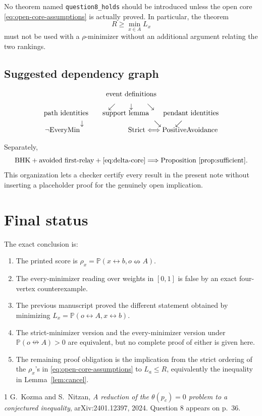 \documentclass[11pt]{article}
\theoremstyle{definition}
\newcommand{\PP}{\mathbb P}
\newcommand{\con}{\leftrightarrow}
\newcommand{\ncon}{\nleftrightarrow}
\newcommand{\1}{\mathbf 1}
\begin{document}
No theorem named \texttt{question8\_holds} should be introduced unless the
open core \eqref{eq:open-core-assumptions} is actually proved.  In
particular, the theorem
\[
 R\ge\min_{x\in A}L_x
\]
must not be used with a \(\rho\)-minimizer without an additional argument
relating the two rankings.

\subsection*{Suggested dependency graph}

\[
\begin{array}{c}
\text{event definitions}
\\[2mm]
\swarrow\qquad\downarrow\qquad\searrow
\\[-1mm]
\text{path identities}
\qquad
\text{support lemma}
\qquad
\text{pendant identities}
\\[1mm]
\downarrow\hspace{35mm}\searrow\qquad\swarrow
\\[-1mm]
\neg\text{EveryMin}
\hspace{24mm}
\text{Strict}\Longleftrightarrow\text{PositiveAvoidance}
\end{array}
\]

Separately,
\[
\text{BHK}+\text{avoided first-relay}+\eqref{eq:delta-core}
\Longrightarrow\text{Proposition~\ref{prop:sufficient}}.
\]
This organization lets a checker certify every result in the present note
without inserting a placeholder proof for the genuinely open implication.

\section{Final status}

The exact conclusion is:
\begin{enumerate}[label=\arabic*.]
\item The printed score is \(\rho_x=\PP(x\con b,o\ncon A)\).
\item The every-minimizer reading over weights in \([0,1]\) is false by an
exact four-vertex counterexample.
\item The previous manuscript proved the different statement obtained by
minimizing \(L_x=\PP(o\con A,x\con b)\).
\item The strict-minimizer version and the every-minimizer version under
\(\PP(o\ncon A)>0\) are equivalent, but no complete proof of either is
given here.
\item The remaining proof obligation is the implication from the strict
ordering of the \(\rho_x\)'s in \eqref{eq:open-core-assumptions} to
\(L_a\le R\), equivalently the inequality in
Lemma~\ref{lem:cancel}.
\end{enumerate}

\begin{thebibliography}{1}
G.~Kozma and S.~Nitzan,
\emph{A reduction of the $\theta(p_c)=0$ problem to a conjectured
inequality}, arXiv:2401.12397, 2024.  Question 8 appears on p.~36.
\end{thebibliography}
\end{document}
